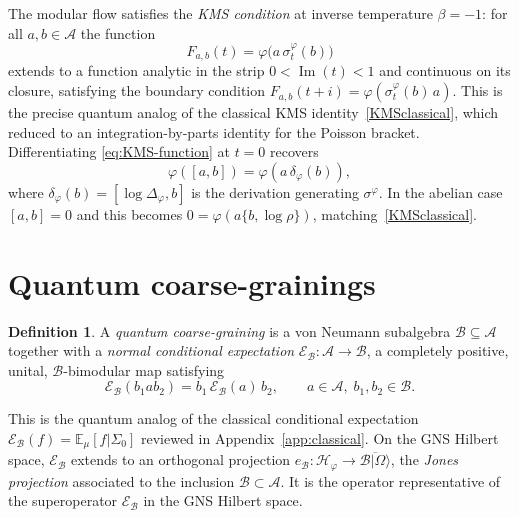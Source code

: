 \documentclass[a4paper,11pt]{article}
\theoremstyle{definition}
\newtheorem{definition}{Definition}[section]
\theoremstyle{remark}
\newcommand{\mB}{\mathcal{B}}
\newcommand{\mE}{\mathcal{E}}
\begin{document}
The modular flow satisfies the \emph{KMS condition} at inverse temperature $\beta=-1$:
for all $a,b\in\mathcal{A}$ the function
\begin{equation}
  F_{a,b}(t) = \varphi\bigl(a\,\sigma_t^\varphi(b)\bigr)
  \label{eq:KMS-function}
\end{equation}
extends to a function analytic in the strip $0<\operatorname{Im}(t)<1$ and continuous
on its closure, satisfying the boundary condition
$F_{a,b}(t+i)=\varphi(\sigma_t^\varphi(b)\,a)$.  This is the precise quantum analog
of the classical KMS identity~\eqref{KMSclassical},
which reduced to an integration-by-parts identity for the Poisson bracket.
Differentiating \eqref{eq:KMS-function} at $t=0$ recovers
\begin{equation}
  \varphi([a,b]) = \varphi(a\,\delta_\varphi(b)),
  \label{eq:KMS-infinitesimal}
\end{equation}
where $\delta_\varphi(b)=[\log\Delta_\varphi,b]$ is the derivation generating
$\sigma^\varphi$.  In the abelian case $[a,b]=0$ and this becomes
$0=\varphi(a\{b,\log\rho\})$, matching~\eqref{KMSclassical}.
 
 \section{Quantum coarse-grainings}\label{subsec:quantum-coarse-2}
 
\begin{definition}
    A \emph{quantum coarse-graining} is a von Neumann subalgebra
$\mathcal{B}\subseteq\mathcal{A}$ together with a \emph{normal conditional expectation}
$\mE_{\mathcal{B}}:\mathcal{A}\to\mathcal{B}$, a completely positive, unital,
$\mathcal{B}$-bimodular map satisfying
\begin{equation}
  \mE_{\mathcal{B}}(b_1 a b_2) = b_1\,\mE_{\mathcal{B}}(a)\,b_2,
  \qquad a\in\mathcal{A},\;b_1,b_2\in\mathcal{B}.
  \label{eq:CE-bimodular}
\end{equation}
\end{definition}

This is the quantum analog of the classical conditional expectation
$\mE_{\mathcal{B}}(f) = \mathbb{E}_\mu[f|\Sigma_0]$ reviewed in
Appendix~\ref{app:classical}.  On the GNS Hilbert space, $\mE_{\mathcal{B}}$ extends
to an orthogonal projection
$e_{\mathcal{B}}:\mathcal{H}_\varphi\to\overline{\mathcal{B}|\Omega\rangle}$, the
\emph{Jones projection} associated to the inclusion $\mathcal{B}\subset\mathcal{A}$.
It is the operator representative of the superoperator $\mE_\mB$ in the GNS Hilbert
space.
 
\end{document}
